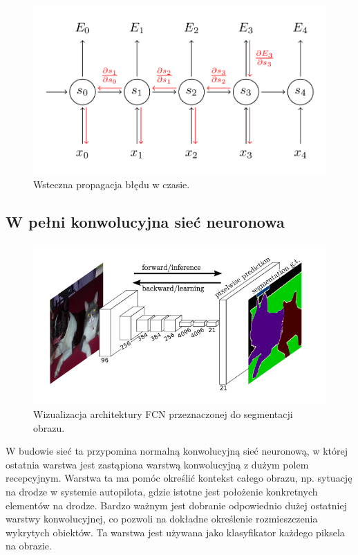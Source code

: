 \documentclass[12pt,a4paper,twoside,titlepage,openright]{book}
\begin{document}
\begin{figure}[ht]
	\centering
			\includegraphics[resolution=100, scale=0.55]{backpropagationThroughTime.png}
		\caption{Wsteczna propagacja błędu w czasie.}
\end{figure}

\subsection{W pełni konwolucyjna sieć neuronowa}

\begin{figure}[ht]
	\centering
			\includegraphics[resolution=100, scale=0.8]{fullyConvolutionalNetwork.png}
		\caption{Wizualizacja architektury FCN przeznaczonej do segmentacji obrazu.}
\end{figure}
W budowie sieć ta przypomina normalną konwolucyjną sieć neuronową, w której ostatnia warstwa jest zastąpiona warstwą konwolucyjną z dużym polem recepcyjnym. Warstwa ta ma pomóc określić kontekst całego obrazu, np. sytuację na drodze w systemie autopilota, gdzie istotne jest położenie konkretnych elementów na drodze. Bardzo ważnym jest dobranie odpowiednio dużej ostatniej warstwy konwolucyjnej, co pozwoli na dokładne określenie rozmieszczenia wykrytych obiektów. Ta warstwa jest używana jako klasyfikator każdego piksela na obrazie.
\end{document}
